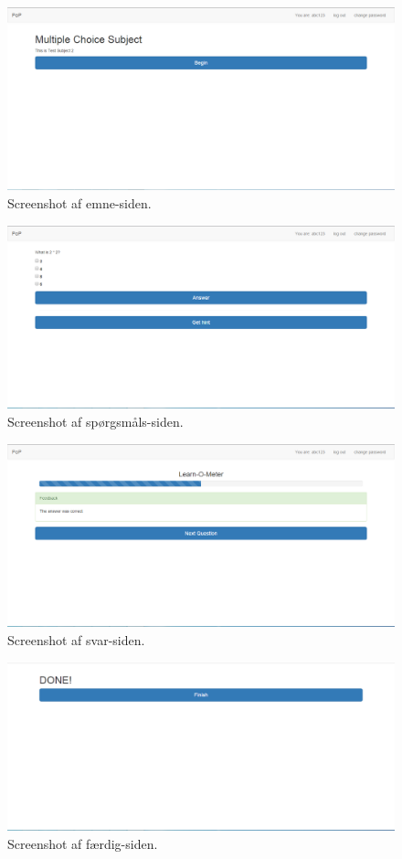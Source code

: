 \documentclass[11pt, a4paper]{article}
\begin{document}
\begin{figure}[h!]
    \centering
    \includegraphics[width=1\linewidth]{figures/interface/subject.png}
    \caption{Screenshot af emne-siden.}
    \label{fig:screenshot_subject}
\end{figure}


\begin{figure}[h!]
    \centering
    \includegraphics[width=1\linewidth]{figures/interface/question.png}
    \caption{Screenshot af spørgsmåls-siden.}
    \label{fig:screenshot_question}
\end{figure}


\begin{figure}[h!]
    \centering
    \includegraphics[width=1\linewidth]{figures/interface/answer.png}
    \caption{Screenshot af svar-siden.}
    \label{fig:screenshot_answer}
\end{figure}


\begin{figure}[h!]
    \centering
    \includegraphics[width=1\linewidth]{figures/interface/finish.png}
    \caption{Screenshot af færdig-siden.}
    \label{fig:screenshot_finish}
\end{figure}
\end{document}
